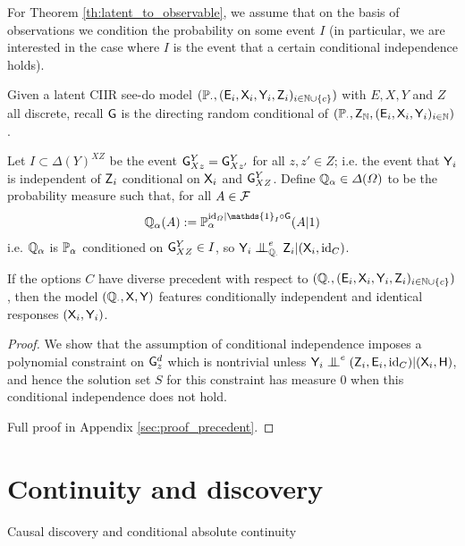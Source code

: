 For Theorem \ref{th:latent_to_observable}, we assume that on the basis of observations we condition the probability on some event $I$ (in particular, we are interested in the case where $I$ is the event that a certain conditional independence holds).

\begin{theorem}\label{th:latent_to_observable}
Given a latent CIIR see-do model $(\mathbb{P}_\cdot,(\mathsf{E}_i,\mathsf{X}_i,\mathsf{Y}_i,\mathsf{Z}_i)_{i\in\mathbb{N}\cup\{c\}})$ with $E,X,Y$ and $Z$ all discrete, recall $\mathsf{G}$ is the directing random conditional of $(\mathbb{P}_\cdot,\mathsf{Z}_{\mathbb{N}},(\mathsf{E}_i,\mathsf{X}_i,\mathsf{Y}_i)_{i\in \mathbb{N}})$.

Let $I\subset \Delta(Y)^{XZ}$ be the event $\mathsf{G}^Y_{Xz}=\mathsf{G}^Y_{Xz'}$ for all $z,z'\in Z$; i.e. the event that $\mathsf{Y}_i$ is independent of $\mathsf{Z}_i$ conditional on $\mathsf{X}_i$ and $\mathsf{G}^Y_{XZ}$. Define $\mathbb{Q}_\alpha\in \Delta(\Omega)$ to be the probability measure such that, for all $A\in \mathcal{F}$
\begin{align}
\prob{Q}_\alpha(A) := \prob{P}_\alpha^{\mathrm{id}_\Omega|\mathds{1}_I\circ \RV{G}}(A|1)
\end{align}
i.e. $\mathbb{Q}_\alpha$ is $\mathbb{P}_\alpha$ conditioned on $\mathsf{G}^Y_{XZ}\in I$, so $\RV{Y}_i\CI^e_{\prob{Q}_\cdot} \RV{Z}_i|(\RV{X}_i,\mathrm{id}_C)$.

If the options $C$ have diverse precedent with respect to $(\mathbb{Q}_\cdot,(\mathsf{E}_i,\mathsf{X}_i,\mathsf{Y}_i,\mathsf{Z}_i)_{i\in\mathbb{N}\cup\{c\}})$, then the model $(\mathbb{Q}_\cdot,\mathsf{X},\mathsf{Y})$ features conditionally independent and identical responses $(\mathsf{X}_i,\mathsf{Y}_i)$.
\end{theorem}

\begin{proof}
We show that the assumption of conditional independence imposes a polynomial constraint on $\mathsf{G}^d_z$ which is nontrivial unless $\RV{Y}_i\CI^e (\RV{Z}_i,\RV{E}_i,\text{id}_C)|(\RV{X}_i,\RV{H})$, and hence the solution set $S$ for this constraint has measure 0 when this conditional independence does not hold.

Full proof in Appendix \ref{sec:proof_precedent}.
\end{proof}

\section{Continuity and discovery}{Causal discovery and conditional absolute continuity}

